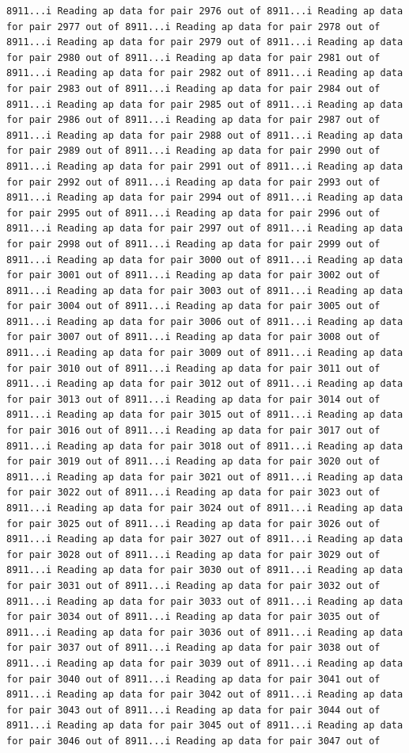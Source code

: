 \documentclass[
]{article}
\begin{document}
\begin{verbatim}
8911...i Reading ap data for pair 2976 out of 8911...i Reading ap data for pair 2977 out of 8911...i Reading ap data for pair 2978 out of 8911...i Reading ap data for pair 2979 out of 8911...i Reading ap data for pair 2980 out of 8911...i Reading ap data for pair 2981 out of 8911...i Reading ap data for pair 2982 out of 8911...i Reading ap data for pair 2983 out of 8911...i Reading ap data for pair 2984 out of 8911...i Reading ap data for pair 2985 out of 8911...i Reading ap data for pair 2986 out of 8911...i Reading ap data for pair 2987 out of 8911...i Reading ap data for pair 2988 out of 8911...i Reading ap data for pair 2989 out of 8911...i Reading ap data for pair 2990 out of 8911...i Reading ap data for pair 2991 out of 8911...i Reading ap data for pair 2992 out of 8911...i Reading ap data for pair 2993 out of 8911...i Reading ap data for pair 2994 out of 8911...i Reading ap data for pair 2995 out of 8911...i Reading ap data for pair 2996 out of 8911...i Reading ap data for pair 2997 out of 8911...i Reading ap data for pair 2998 out of 8911...i Reading ap data for pair 2999 out of 8911...i Reading ap data for pair 3000 out of 8911...i Reading ap data for pair 3001 out of 8911...i Reading ap data for pair 3002 out of 8911...i Reading ap data for pair 3003 out of 8911...i Reading ap data for pair 3004 out of 8911...i Reading ap data for pair 3005 out of 8911...i Reading ap data for pair 3006 out of 8911...i Reading ap data for pair 3007 out of 8911...i Reading ap data for pair 3008 out of 8911...i Reading ap data for pair 3009 out of 8911...i Reading ap data for pair 3010 out of 8911...i Reading ap data for pair 3011 out of 8911...i Reading ap data for pair 3012 out of 8911...i Reading ap data for pair 3013 out of 8911...i Reading ap data for pair 3014 out of 8911...i Reading ap data for pair 3015 out of 8911...i Reading ap data for pair 3016 out of 8911...i Reading ap data for pair 3017 out of 8911...i Reading ap data for pair 3018 out of 8911...i Reading ap data for pair 3019 out of 8911...i Reading ap data for pair 3020 out of 8911...i Reading ap data for pair 3021 out of 8911...i Reading ap data for pair 3022 out of 8911...i Reading ap data for pair 3023 out of 8911...i Reading ap data for pair 3024 out of 8911...i Reading ap data for pair 3025 out of 8911...i Reading ap data for pair 3026 out of 8911...i Reading ap data for pair 3027 out of 8911...i Reading ap data for pair 3028 out of 8911...i Reading ap data for pair 3029 out of 8911...i Reading ap data for pair 3030 out of 8911...i Reading ap data for pair 3031 out of 8911...i Reading ap data for pair 3032 out of 8911...i Reading ap data for pair 3033 out of 8911...i Reading ap data for pair 3034 out of 8911...i Reading ap data for pair 3035 out of 8911...i Reading ap data for pair 3036 out of 8911...i Reading ap data for pair 3037 out of 8911...i Reading ap data for pair 3038 out of 8911...i Reading ap data for pair 3039 out of 8911...i Reading ap data for pair 3040 out of 8911...i Reading ap data for pair 3041 out of 8911...i Reading ap data for pair 3042 out of 8911...i Reading ap data for pair 3043 out of 8911...i Reading ap data for pair 3044 out of 8911...i Reading ap data for pair 3045 out of 8911...i Reading ap data for pair 3046 out of 8911...i Reading ap data for pair 3047 out of 
\end{verbatim}
\end{document}
